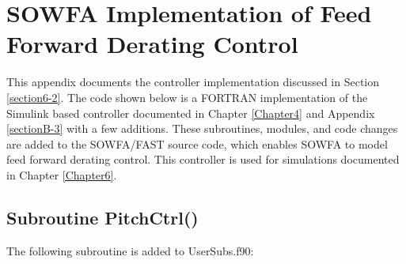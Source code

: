 
\chapter{SOWFA Implementation of Feed Forward Derating Control} %

\label{AppendixD} %


This appendix documents the controller implementation discussed in Section \ref{section6-2}. The code shown below is a FORTRAN implementation of the Simulink based controller documented in Chapter \ref{Chapter4} and Appendix \ref{sectionB-3} with a few additions.  These subroutines, modules, and code changes are added to the SOWFA/FAST source code, which enables SOWFA to model feed forward derating control. This controller is used for simulations documented in Chapter \ref{Chapter6}.




\section{Subroutine PitchCtrl()} \label{sectionD-1}
The following subroutine is added to UserSubs.f90:

